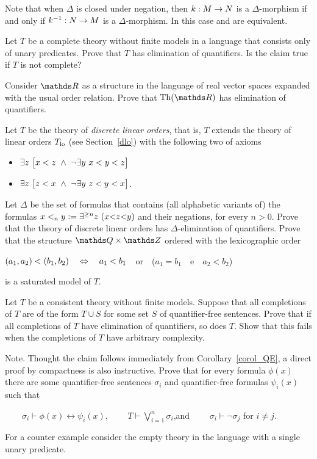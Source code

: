 Note that when $\Delta$ is closed under negation, then  $k:M\rightarrow N$ is a $\Delta$-morphism if and only if $k^{-1}:N\rightarrow M$ is a $\Delta$-morphism. In this case  and  are equivalent.

\begin{exercise}
Let $T$ be a complete theory without finite models in a language that consists only of unary predicates. 
Prove that $T$ has elimination of quantifiers.
Is the claim true if $T$ is not complete?
\end{exercise}

\begin{exercise}
Consider $\RR$ as a structure in the language of real vector spaces expanded with the usual order relation.
Prove that $\Th(\RR)$ has elimination of quantifiers.
\end{exercise}

\begin{exercise}\label{ex_discrete_lo}
Let $T$ be the theory of \emph{discrete linear orders}, that is, $T$ extends the theory of linear orders $T_{\rm lo}$  (see Section~\ref{dlo}) with the following two of axioms
\begin{itemize}
\item[dis$\uparrow$.] $\E z\ \big[x<z\ \wedge\ \neg\E y\ x<y<z\big]$
\item[dis$\downarrow$.] $\E z\ \big[ z<x\ \wedge\ \neg\E y\ z<y<x\big]$.
\end{itemize}
Let $\Delta$ be the set of formulas that contains (all alphabetic variants of) the formulas $x<_ny:=\E^{\ge n}z\ (x\mathord<z\mathord< y)$ and their negations, for every $n>0$.
Prove that the theory of discrete linear orders has $\Delta$-elimination of quantifiers.
Prove that the structure $\QQ\times\ZZ$ ordered with the lexicographic order 

\hfil$(a_1,a_2)<(b_1,b_2)\quad\Leftrightarrow\quad a_1<b_1$\ \ or\ \ ($a_1=b_1$\ \ e\ \ $a_2<b_2$)

is a saturated model of $T$.
\end{exercise}

\begin{exercise}
Let $T$ be a consistent theory without finite models.
Suppose that all completions of $T$ are of the form $T\cup S$ for some set $S$ of quantifier-free sentences.
Prove that if all completions of $T$ have elimination of quantifiers, so does $T$.
Show that this fails when the completions of $T$ have arbitrary complexity.

Note. Thought the claim follows immediately from Corollary~\ref{corol_QE}, a direct proof by compactness is also instructive.
Prove that for every formula $\phi(x)$ there are some quantifier-free sentences $\sigma_i$ and quantifier-free formulas $\psi_i(x)$ such that

$\displaystyle\qquad\sigma_i\vdash\phi(x)\leftrightarrow\psi_i(x)$, 
$\qquad\displaystyle T\vdash\bigvee^n_{i=1}\sigma_i$,\qquad and  $\qquad\sigma_i\vdash\neg\sigma_j$ for $i\neq j$.

For a counter example consider the empty theory in the language with a single unary predicate.
\end{exercise}

